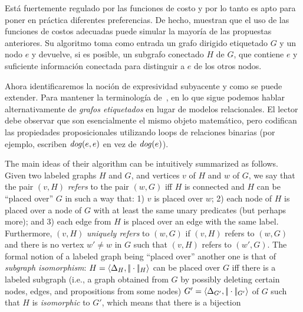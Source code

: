 Est\'a fuertemente regulado por las funciones de costo y por lo tanto es apto para poner en pr\'actica
diferentes preferencias. De hecho, muestran que el uso de las funciones de costos adecuadas
puede simular la mayor\'ia de las propuestas anteriores. Su algoritmo toma como entrada
un grafo dirigido etiquetado $G$ y un nodo $e$ y devuelve, si es posible,
un subgrafo conectado $H$  de $G$, que contiene $e$ y suficiente informaci\'on conectada para
distinguir a $e$ de los otros nodos.

Ahora identificaremos la noci\'on de expresividad subyacente y como se puede extender.
Para mantener la terminolog\'ia de~\cite{Krahmer2003}, en lo que sigue
podemos hablar alternativamente de \emph{grafos etiquetados} en lugar de modelos relacionales.
El lector debe observar que son esencialmente el mismo objeto matem\'atico, pero codifican las propiedades proposicionales utilizando
loops de relaciones binarias (por ejemplo, escriben $\mathit{dog}(e,e)$ en vez de $\mathit{dog}(e)$).

The main ideas of their algorithm can be
intuitively summarized as follows.
Given two labeled graphs $H$ and $G$, and vertices $v$ of $H$
and $w$ of $G$, we say that the pair $(v,H)$ {\em refers}
to the pair $(w,G)$ iff $H$ is connected and $H$ can be ``placed
over'' $G$ in such a way that: 1) $v$ is placed over $w$; 2) each
node of $H$ is placed over a node of $G$ with at least the same
unary predicates (but perhaps more); and 3) each edge from $H$ is
placed over an edge with the same label. Furthermore, $(v,H)$ {\em
uniquely refers} to $(w,G)$ if $(v,H)$ refers to $(w,G)$ and there
is no vertex $w'\not=w$ in $G$ such that $(v,H)$ refers to $(w',G)$.
The formal notion of a labeled graph being ``placed over'' another
one is that of {\em subgraph isomorphism}:
$H=\langle \Delta_H,|\!|\cdot|\!|_H \rangle$ can be placed over
$G$ iff there is a labeled subgraph (i.e., a graph obtained from
$G$ by possibly deleting certain nodes, edges, and propositions from some nodes)
$G'=\langle \Delta_{G'},|\!|\cdot|\!|_{G'} \rangle$ of $G$ such that $H$ is {\em
isomorphic} to $G'$, which means that there is a
bijection


